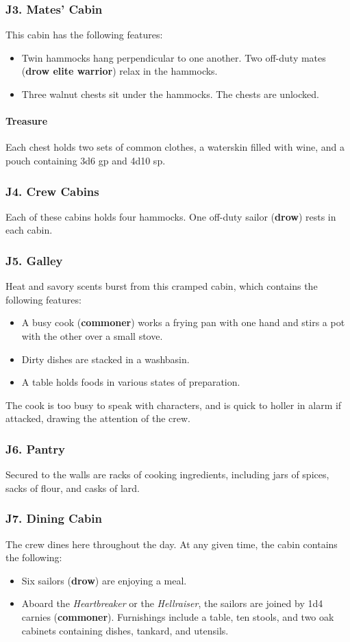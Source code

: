\documentclass[10pt,a4paper,twoside,twocolumn,openany,nodeprecatedcode]{dndbook}
\begin{document}
\subsubsection{J3. Mates' Cabin}
This cabin has the following features:
\begin{itemize}

\item Twin hammocks hang perpendicular to one another. Two off-duty mates (\textbf{drow elite warrior}) relax in the hammocks.
\item Three walnut chests sit under the hammocks. The chests are unlocked.
\end{itemize}


\paragraph{Treasure}
Each chest holds two sets of common clothes, a waterskin filled with wine, and a pouch containing 3d6 gp and 4d10 sp.
\subsubsection{J4. Crew Cabins}
Each of these cabins holds four hammocks. One off-duty sailor (\textbf{drow}) rests in each cabin.
\subsubsection{J5. Galley}
Heat and savory scents burst from this cramped cabin, which contains the following features:
\begin{itemize}

\item A busy cook (\textbf{commoner}) works a frying pan with one hand and stirs a pot with the other over a small stove.
\item Dirty dishes are stacked in a washbasin.
\item A table holds foods in various states of preparation.
\end{itemize}


The cook is too busy to speak with characters, and is quick to holler in alarm if attacked, drawing the attention of the crew.
\subsubsection{J6. Pantry}
Secured to the walls are racks of cooking ingredients, including jars of spices, sacks of flour, and casks of lard.
\subsubsection{J7. Dining Cabin}
The crew dines here throughout the day. At any given time, the cabin contains the following:
\begin{itemize}

\item Six sailors (\textbf{drow}) are enjoying a meal.
\item Aboard the \textit{Heartbreaker} or the \textit{Hellraiser}, the sailors are joined by 1d4 carnies (\textbf{commoner}). Furnishings include a table, ten stools, and two oak cabinets containing dishes, tankard, and utensils.
\end{itemize}
\end{document}
